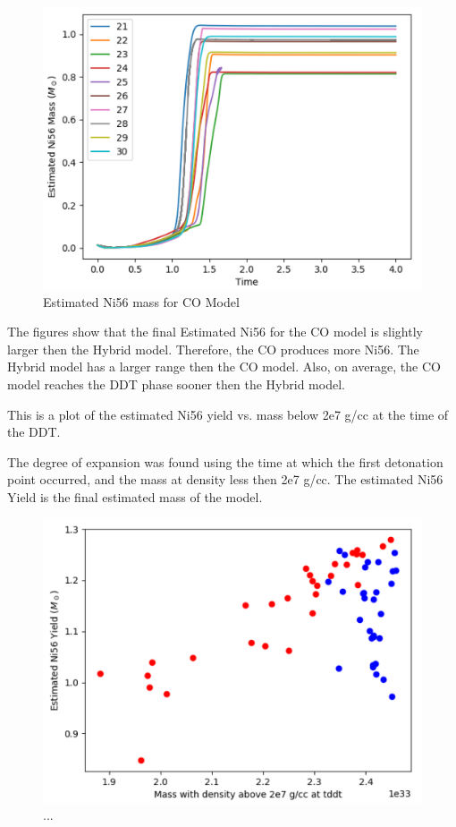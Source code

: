 \documentclass[iop,apj]{emulateapj}
\begin{document}
\begin{figure}
\includegraphics[width=\columnwidth]{figures/ni56_vs_time_CO.png}
\caption{\label{fig:nitco}
Estimated Ni56 mass for CO Model
}
\end{figure}

The figures show that the final Estimated Ni56 for the CO model is
slightly larger then the Hybrid model. Therefore, the CO produces more
Ni56. The Hybrid model has a larger range then the CO model. Also, on
average, the CO model reaches the DDT phase sooner then the Hybrid model.


This is a plot of the estimated Ni56 yield vs. mass below 2e7 g/cc at
the time of the DDT.

The degree of expansion was found using the time at which the first
detonation point occurred, and the mass at density less then 2e7 g/cc. The
estimated Ni56 Yield is the final estimated mass of the model.

\begin{figure}
\includegraphics[width=\columnwidth]{figures/ni56_yield_vs_mass_at_high_dens.png}
\caption{\label{fig:masshighdens}
...
}
\end{figure}
\end{document}
